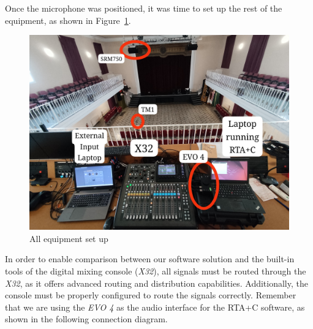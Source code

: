 Once the microphone was positioned, it was time to set up the rest of the equipment, as shown in Figure~\ref{fig:Coro_setup}.

\begin{figure}[H]
	\centering
	\includegraphics[width=0.8
	\linewidth]{Figures/Coro_setup.jpeg}
	\caption{All equipment set up}
	\label{fig:Coro_setup}
\end{figure}

In order to enable comparison between our software solution and the built-in tools of the digital mixing console (\textit{X32}), all signals must be routed through the \textit{X32}, as it offers advanced routing and distribution capabilities. Additionally, the console must be properly configured to route the signals correctly. Remember that we are using the \textit{EVO 4} as the audio interface for the RTA+C software, as shown in the following connection diagram.

